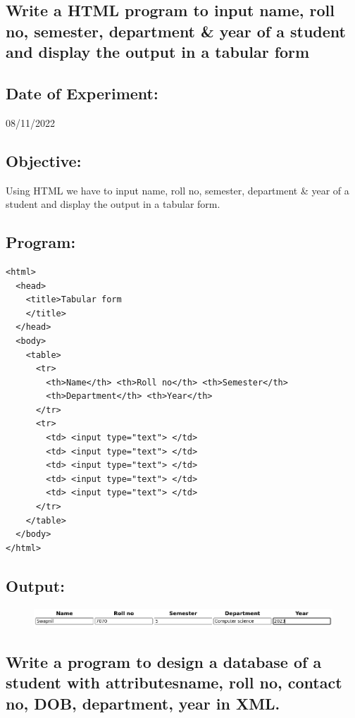 \documentclass[12pt, a4paper]{article}
\begin{document}
\begin{tcolorbox}
  \section{Write a HTML program to input name, roll no, semester, department \& year of a student and display the output in a tabular form}
\end{tcolorbox}
\subsection*{Date of Experiment:}
08/11/2022
\subsection*{Objective:}
Using HTML we have to input name, roll no, semester, department \& year of a student and display the output in a tabular form.

\subsection*{Program:}
\begin{lstlisting}
<html>
  <head>
    <title>Tabular form
    </title>
  </head>
  <body>
    <table>
      <tr>
        <th>Name</th> <th>Roll no</th> <th>Semester</th>
        <th>Department</th> <th>Year</th>
      </tr>
      <tr>
        <td> <input type="text"> </td>
        <td> <input type="text"> </td>
        <td> <input type="text"> </td>
        <td> <input type="text"> </td>
        <td> <input type="text"> </td>
      </tr>
    </table>
  </body>
</html>
\end{lstlisting}
\pagebreak
\subsection*{Output:}
\vskip10pt
\begin{figure}[ht]
  \centering
  \includegraphics[width=\textwidth]{6}
\end{figure}

\pagebreak

\begin{tcolorbox}
  \section{Write a program to design a database of a student with attributesname, roll no, contact no, DOB, department, year in XML.}
\end{tcolorbox}
\end{document}
